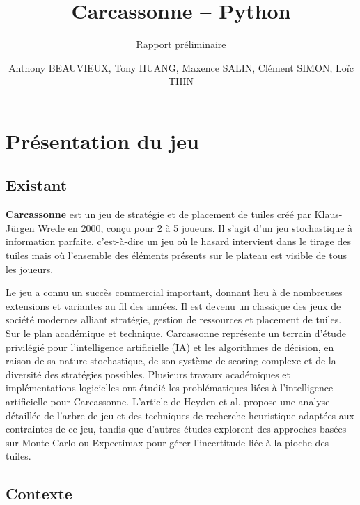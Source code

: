 \documentclass[11pt]{article}
\title{Carcassonne -- Python}
\subtitle{Rapport préliminaire}
\author{Anthony BEAUVIEUX, Tony HUANG, Maxence SALIN, Clément SIMON, Loïc THIN}
\date{}
\begin{document}

\maketitle
\thispagestyle{empty}


\section{Présentation du jeu}

\subsection{Existant}

\textbf{Carcassonne} est un jeu de stratégie et de placement de tuiles créé par Klaus-Jürgen Wrede en 2000, conçu pour 2 à 5 joueurs.
Il s'agit d'un jeu stochastique à information parfaite, c'est-à-dire un jeu où le hasard intervient dans le tirage des tuiles mais où l'ensemble des éléments présents sur le plateau est visible de tous les joueurs.

Le jeu a connu un succès commercial important, donnant lieu à de nombreuses extensions et variantes au fil des années. Il est devenu un classique des jeux de société modernes alliant stratégie, gestion de ressources et placement de tuiles. Sur le plan académique et technique, Carcassonne représente un terrain d'étude privilégié pour l'intelligence artificielle (IA) et les algorithmes de décision, en raison de sa nature stochastique, de son système de scoring complexe et de la diversité des stratégies possibles. Plusieurs travaux académiques et implémentations logicielles ont étudié les problématiques liées à l'intelligence artificielle pour Carcassonne. L'article de Heyden et al.\cite{heyden2009implementing} propose une analyse détaillée de l'arbre de jeu et des techniques de recherche heuristique adaptées aux contraintes de ce jeu, tandis que d'autres études explorent des approches basées sur Monte Carlo ou Expectimax pour gérer l'incertitude liée à la pioche des tuiles.


\subsection{Contexte}
\end{document}

